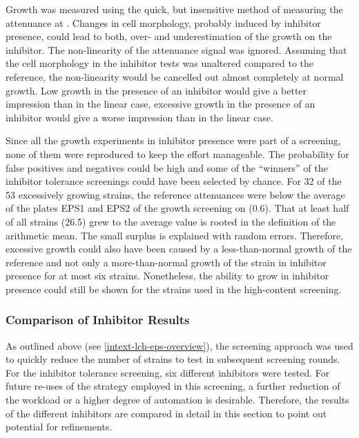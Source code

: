 Growth was measured using the quick, but insensitive method of measuring the attenuance at . Changes in cell morphology, probably induced by inhibitor presence, could lead to both, over- and underestimation of the growth on the inhibitor. The non-linearity of the attenuance signal was ignored. Assuming that the cell morphology in the inhibitor tests was unaltered compared to the reference, the non-linearity would be cancelled out almost completely at normal growth. Low growth in the presence of an inhibitor would give a better impression than in the linear case, excessive growth in the presence of an inhibitor would give a worse impression than in the linear case.

Since all the growth experiments in inhibitor presence were part of a screening, none of them were reproduced to keep the effort manageable. The probability for false positives and negatives could be high and some of the \enquote{winners} of the inhibitor tolerance screenings could have been selected by chance. For 32 of the 53 excessively growing strains, the reference attenuances were below the average of the plates EPS1 and EPS2 of the growth screening on \xyl{} (\num{0.6}). That at least half of all strains (26.5) grew to the average value is rooted in the definition of the arithmetic mean. The small surplus is explained with random errors. Therefore, excessive growth could also have been caused by a less-than-normal growth of the reference and not only a more-than-normal growth of the strain in inhibitor presence for at most six strains. Nonetheless, the ability to grow in inhibitor presence could still be shown for the strains used in the high-content screening.

\subsubsection{Comparison of Inhibitor Results}
As outlined above (see \vref{intext-lch-eps-overview}), the screening approach was used to quickly reduce the number of strains to test in subsequent screening rounds. For the inhibitor tolerance screening, six different inhibitors were tested. For future re-uses of the strategy employed in this screening, a further reduction of the workload or a higher degree of automation is desirable. Therefore, the results of the different inhibitors are compared in detail in this section to point out potential for refinements.

